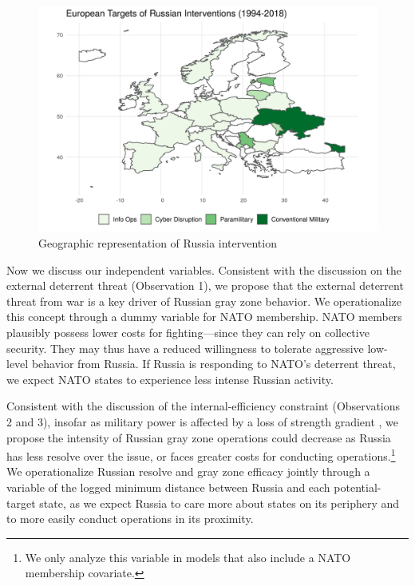 \documentclass[bibtex, autowc]{apsr_submission}
\begin{document}
	\begin{figure}[H]
		\centering
		\includegraphics[width = \textwidth]{map_aggregate_europe.png}
		\caption{Geographic representation of Russia intervention}
		\label{fig:map}
	\end{figure}

Now we discuss our independent variables. Consistent with the discussion on the external deterrent threat (Observation 1), we propose that the external deterrent threat from war is a key driver of Russian gray zone behavior. We operationalize this concept through a dummy variable for NATO membership. NATO members plausibly possess lower costs for fighting---since they can rely on collective security. They may thus have a reduced willingness to tolerate aggressive low-level behavior from Russia. If Russia is responding to NATO's deterrent threat, we expect NATO states to experience less intense Russian activity. 

Consistent with the discussion of the internal-efficiency constraint (Observations 2 and 3), insofar as military power is affected by a loss of strength gradient \citep{corbett_principlesmaritimestrategy_1911, posen_commandcommonsmilitary_2003}, we propose the intensity of Russian gray zone operations could decrease as Russia has less resolve over the issue, or faces greater costs for conducting operations.\footnote{We only analyze this variable in models that also include a NATO membership covariate.} We operationalize Russian resolve and gray zone efficacy jointly through a variable of the logged minimum distance between Russia and each potential-target state, as we expect Russia to care more about states on its periphery and to more easily conduct operations in its proximity.
\end{document}
